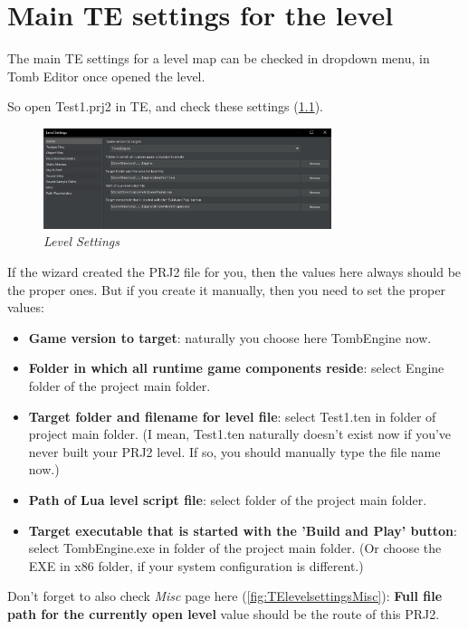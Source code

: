 \chapter{Main TE settings for the level}

The main TE settings for a level map can be checked in dropdown  menu, in Tomb Editor once opened the level.

So open Test1.prj2 in TE, and check these settings (\ref{fig:TElevelsettings}).

\begin{figure}
    \centering
     \includegraphics[width=0.75\textwidth]{screenshots/23.jpg}
     \caption{\emph{Level Settings}}
     \label{fig:TElevelsettings}
\end{figure}

If the wizard created the PRJ2 file for you, then the values here always should be the proper ones. But if you create it manually, then you need to set the proper values:
\begin{itemize}
    \item \textbf{Game version to target}: naturally you choose here TombEngine now.
    \item \textbf{Folder in which all runtime game components reside}: select Engine folder of the project main folder.
    \item \textbf{Target folder and filename for level file}: select Test1.ten in  folder of project main folder. (I mean, Test1.ten naturally doesn't exist now if you've never built your PRJ2 level. If so, you should manually type the file name now.)
    \item \textbf{Path of Lua level script file}: select  folder of the project main folder.
    \item \textbf{Target executable that is started with the 'Build and Play' button}: select TombEngine.exe in  folder of the project main folder. (Or choose the EXE in x86 folder, if your system configuration is different.)
\end{itemize}

 Don't forget to also check \emph{Misc} page here (\ref{fig:TElevelsettingsMisc}): \textbf{Full file path for the currently open level} value should be the route of this PRJ2.

